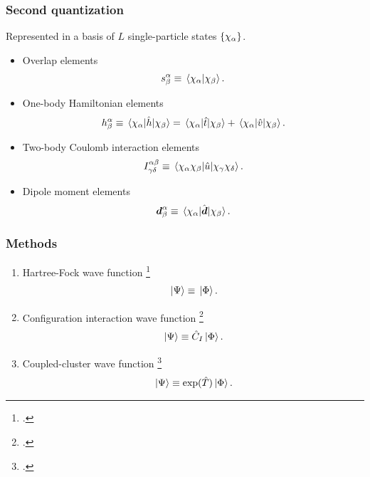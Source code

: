 \documentclass{beamer}
\begin{document}
\begin{frame}
    \frametitle{Second quantization}
    Represented in a basis of $L$ single-particle states $\left\{ \chi_{\alpha} \right\}$.
    \begin{itemize}
        \item Overlap elements
            \begin{align}
                s^{\alpha}_{\beta}
                \equiv \braket*{\chi_{\alpha}}{\chi_{\beta}}.
            \end{align}
        \item One-body Hamiltonian elements
            \begin{align}
                h^{\alpha}_{\beta}
                \equiv \mel*{\chi_{\alpha}}{\hat{h}}{\chi_{\beta}}
                = \mel*{\chi_{\alpha}}{\hat{t}}{\chi_{\beta}}
                + \mel*{\chi_{\alpha}}{\hat{v}}{\chi_{\beta}}.
            \end{align}
        \item Two-body Coulomb interaction elements
            \begin{align}
                I^{\alpha\beta}_{\gamma\delta}
                \equiv
                \mel*{\chi_{\alpha}\chi_{\beta}}{
                    \hat{u}
                }{\chi_{\gamma}\chi_{\delta}}.
            \end{align}
        \item Dipole moment elements
            \begin{align}
                \boldsymbol{d}^{\alpha}_{\beta}
                \equiv
                \mel*{\chi_{\alpha}}{\hat{\boldsymbol{d}}}{\chi_{\beta}}.
            \end{align}
    \end{itemize}
\end{frame}

\begin{frame}
    \frametitle{Methods}
    \begin{enumerate}
        \item Hartree-Fock wave function \footcite{szabo1996modern}
            \begin{align}
                \ket*{\Psi} \equiv \ket*{\Phi}.
            \end{align}
        \item Configuration interaction wave function
            \footcite{helgaker-molecular}
            \begin{align}
                \ket*{\Psi} \equiv \hat{C}_{I}\ket*{\Phi}.
            \end{align}
        \item Coupled-cluster wave function \footcite{coester1958421}
            \begin{align}
                \ket*{\Psi} \equiv \exponential(\clust)\ket*{\slat}.
            \end{align}
    \end{enumerate}
\end{frame}
\end{document}

